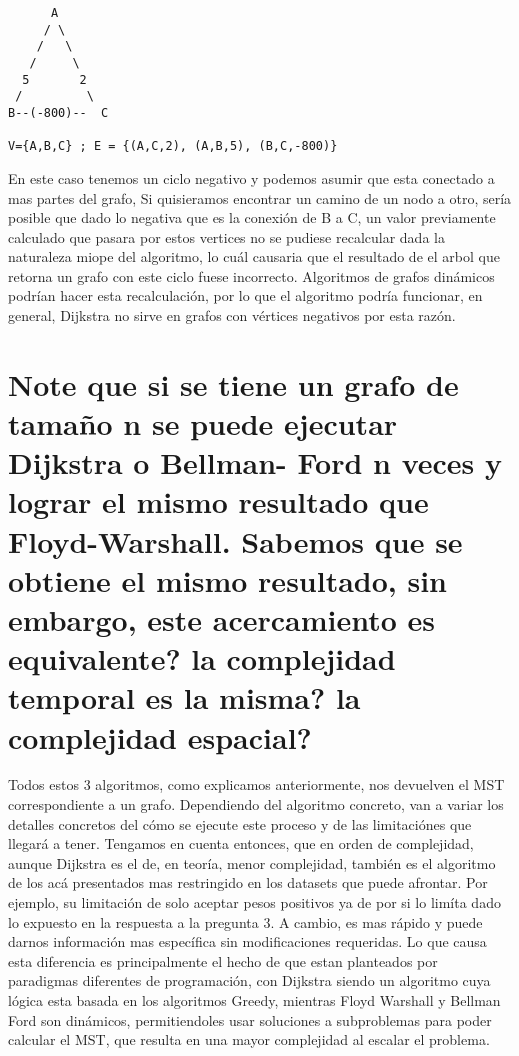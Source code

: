 \documentclass[a4paper]{article}
\begin{document}
\begin{verbatim}
      A
     / \
    /   \
   /     \
  5       2
 /         \
B--(-800)--  C

V={A,B,C} ; E = {(A,C,2), (A,B,5), (B,C,-800)}
\end{verbatim}

En este caso tenemos un ciclo negativo y podemos asumir que esta conectado a mas partes
del grafo,  Si quisieramos encontrar un camino de un nodo a otro, sería 
posible que dado lo negativa que es la conexión de B a C, un valor previamente calculado
que pasara por estos vertices no se pudiese recalcular dada la naturaleza miope
del algoritmo, lo cuál causaria que el resultado de el arbol que retorna un grafo con este
ciclo fuese incorrecto. Algoritmos de grafos dinámicos podrían hacer esta recalculación,
por lo que el algoritmo podría funcionar, en general, Dijkstra no sirve en grafos con
vértices negativos por esta razón.


\section{Note que si se tiene un grafo de tamaño n se puede ejecutar Dijkstra o Bellman-
Ford n veces y lograr el mismo resultado que Floyd-Warshall. Sabemos que
se obtiene el mismo resultado, sin embargo, este acercamiento es equivalente? la
complejidad temporal es la misma? la complejidad espacial?}

Todos estos 3 algoritmos, como explicamos anteriormente, nos devuelven el MST 
correspondiente a un grafo. Dependiendo del algoritmo concreto, van a variar los detalles concretos
del cómo se ejecute este proceso y de las limitaciónes que llegará a tener. Tengamos en cuenta entonces, 
que en orden de complejidad, aunque Dijkstra es el de, en teoría, menor complejidad, también es el algoritmo
de los acá presentados mas restringido en los datasets que puede afrontar. Por ejemplo, su limitación de 
solo aceptar pesos positivos ya de por si lo limíta dado lo expuesto en la respuesta a la pregunta 3.
A cambio, es mas rápido y puede darnos información mas específica sin modificaciones
requeridas. Lo que causa esta diferencia es principalmente el hecho de que estan planteados por paradigmas diferentes
de programación, con Dijkstra siendo un algoritmo cuya lógica esta basada en los algoritmos
Greedy, mientras Floyd Warshall y Bellman Ford son dinámicos, permitiendoles usar soluciones a 
subproblemas para poder calcular el MST, que resulta en una mayor complejidad al escalar el
problema. 
\end{document}
